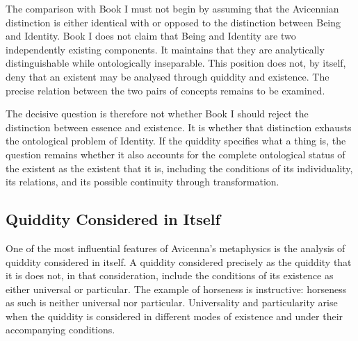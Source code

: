 \label{para:VS.B01.P01.C08.S13.SS05.P005}

The comparison with Book I must
not begin by assuming that the
Avicennian distinction is either
identical with or opposed to the
distinction between Being and
Identity. Book I does not claim
that Being and Identity are two
independently existing components.
It maintains that they are
analytically distinguishable
while ontologically inseparable.
This position does not, by itself,
deny that an existent may be
analysed through quiddity and
existence. The precise relation
between the two pairs of concepts
remains to be examined.

\label{para:VS.B01.P01.C08.S13.SS05.P006}

The decisive question is therefore
not whether Book I should reject
the distinction between essence
and existence. It is whether
that distinction exhausts the
ontological problem of Identity.
If the quiddity specifies what
a thing is, the question remains
whether it also accounts for
the complete ontological status
of the existent as the existent
that it is, including the
conditions of its individuality,
its relations, and its possible
continuity through transformation.



\subsection{Quiddity Considered in Itself}
\label{subsec:ch08-avicenna-quiddity-itself}

\label{para:VS.B01.P01.C08.S13.SS06.P001}

One of the most influential features
of Avicenna's metaphysics is the
analysis of quiddity considered
in itself. A quiddity considered
precisely as the quiddity that
it is does not, in that consideration,
include the conditions of its
existence as either universal
or particular. The example of
horseness is instructive: horseness
as such is neither universal
nor particular. Universality and
particularity arise when the
quiddity is considered in
different modes of existence
and under their accompanying
conditions.
\citep[Ilahiyyat, V.1--2]{AvicennaMetaphysics}

